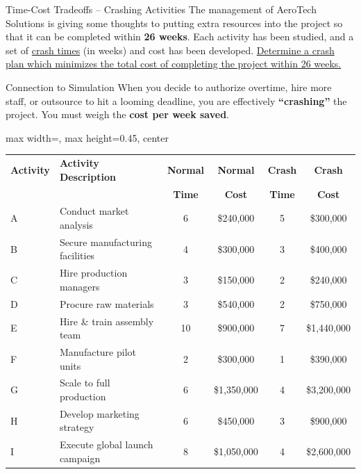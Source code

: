 \documentclass[11pt,aspectratio=169]{beamer}
\begin{document}
\begin{frame}{Time-Cost Tradeoffs -- Crashing Activities}
    The management of AeroTech Solutions is giving some thoughts to putting extra resources into the project so that it can be completed within \textbf{26 weeks}. Each activity has been studied, and a set of \underline{crash times} (in weeks) and cost has been developed. \underline{Determine a crash plan which minimizes the total cost of completing the project within 26 weeks.}
    
    \vspace{0.5em}
    \begin{alertblock}{Connection to Simulation}
        When you decide to authorize overtime, hire more staff, or outsource to hit a looming deadline, you are effectively \textbf{``crashing''} the project. You must weigh the \textbf{cost per week saved}.
    \end{alertblock}
    
    \vspace{0.5em}
    \begin{adjustbox}{max width=\linewidth, max height=0.45\textheight, center}
    \begin{tabular}{llcccc}
        \toprule
        \textbf{Activity} & \textbf{Activity Description} & \textbf{Normal} & \textbf{Normal} & \textbf{Crash} & \textbf{Crash} \\
        & & \textbf{Time} & \textbf{Cost} & \textbf{Time} & \textbf{Cost} \\
        \midrule
        A & Conduct market analysis & 6 & \$240,000 & 5 & \$300,000 \\
        B & Secure manufacturing facilities & 4 & \$300,000 & 3 & \$400,000 \\
        C & Hire production managers & 3 & \$150,000 & 2 & \$240,000 \\
        D & Procure raw materials & 3 & \$540,000 & 2 & \$750,000 \\
        E & Hire \& train assembly team & 10 & \$900,000 & 7 & \$1,440,000 \\
        F & Manufacture pilot units & 2 & \$300,000 & 1 & \$390,000 \\
        G & Scale to full production & 6 & \$1,350,000 & 4 & \$3,200,000 \\
        H & Develop marketing strategy & 6 & \$450,000 & 3 & \$900,000 \\
        I & Execute global launch campaign & 8 & \$1,050,000 & 4 & \$2,600,000 \\
        \bottomrule
    \end{tabular}
    \end{adjustbox}
\end{frame}
\end{document}
